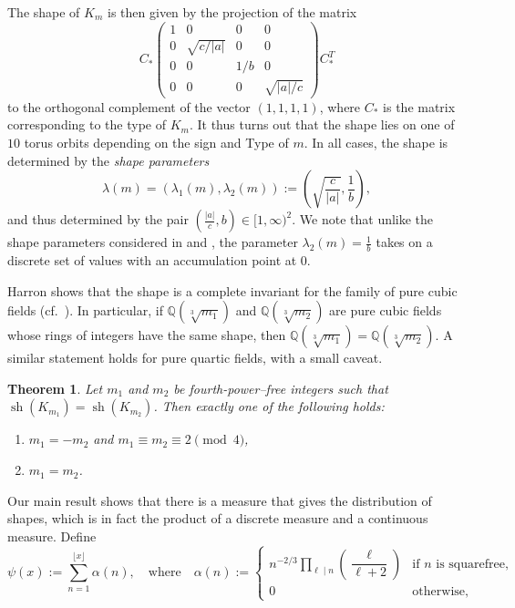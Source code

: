 \documentclass[table]{amsart}
\newtheorem{theorem}{Theorem}[section]
\newcommand{\Q}{\mathbb{Q}}
\numberwithin{equation}{section}
\begin{document}
\noindent The shape of $K_m$ is then given by the projection of the matrix
$$
C_\ast \begin{pmatrix}
1 & 0 & 0 & 0 \\
0 & \sqrt{c/|a|} & 0 & 0 \\
0 & 0 & 1/b & 0 \\
0 & 0 & 0 & \sqrt{|a|/c}
\end{pmatrix} C_\ast^T
$$
\noindent to the orthogonal complement of the vector $(1, 1, 1, 1)$, where $C_\ast$ is the matrix corresponding to the type of $K_m$. 
It thus turns out that the shape lies on one of $10$ torus orbits depending on the sign and Type of $m$. In all cases, the shape is determined by the \emph{shape parameters} 
\[\lambda(m)=(\lambda_1(m), \lambda_2(m)):=\left( \sqrt{\frac{c}{|a|}}, \frac{1}{b}\right),\] and thus determined by the pair $(\frac{|a|}{c}, b)\in [1, \infty)^2$. We note that unlike the shape parameters considered in \cite{Har17} and \cite{Hol22}, the parameter $\lambda_2(m)=\frac{1}{b}$ takes on a discrete set of values with an accumulation point at $0$. 

Harron shows that the shape is a complete invariant for the family of pure cubic fields (cf.~\cite[Theorem B]{Har17}). In particular, if $\Q(\!\sqrt[3]{m_1})$ and $\Q(\!\sqrt[3]{m_2})$ are pure cubic fields whose rings of integers have the same shape, then $\Q(\!\sqrt[3]{m_1})=\Q(\!\sqrt[3]{m_2})$. A similar statement holds for pure quartic fields, with a small caveat.

\begin{theorem}\label{shape complete invariant}
Let $m_1$ and $m_2$ be fourth-power--free integers such that $\operatorname{sh}(K_{m_1})=\operatorname{sh}(K_{m_2})$. Then exactly one of the following holds:
\begin{enumerate}
    \item $m_1=-m_2$ and $m_1\equiv m_2\equiv 2 \pmod{4}$,
    \item $m_1=m_2$.
\end{enumerate}
\end{theorem}


\par Our main result shows that there is a measure that gives the distribution of shapes, which is in fact the product of a discrete measure and a continuous measure. Define
$$
\psi(x) := \sum_{n = 1}^{\lfloor x \rfloor} \alpha(n),
\quad \text{where} \quad
\alpha(n) := \begin{cases}
n^{-2/3} \displaystyle\prod_{\ell \mid n} \left( \dfrac{\ell}{\ell + 2} \right) & \text{if } n \text{ is squarefree}, \\
0 & \text{otherwise},
\end{cases}
$$
\end{document}
